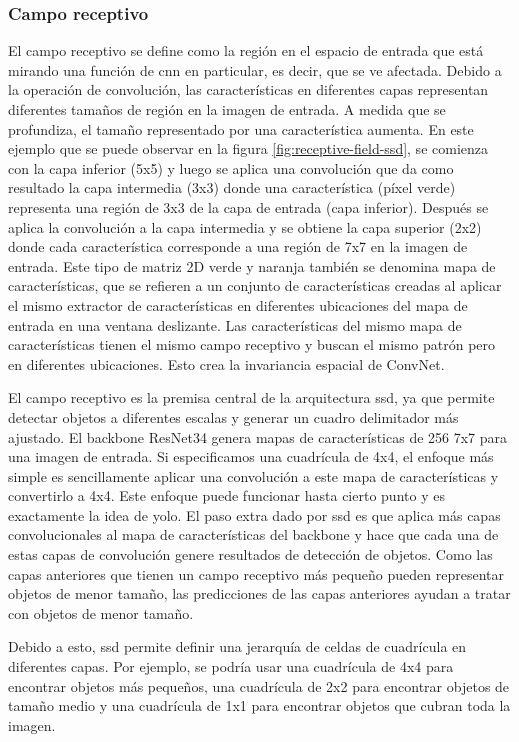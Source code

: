 \subsubsection*{Campo receptivo}
\label{subsubsec:receptive-field-ssd}

El campo receptivo se define como la región en el espacio de entrada que está mirando una función de \gls{cnn} en particular, es decir, que se ve afectada. Debido a la operación de convolución, las características en diferentes capas representan diferentes tamaños de región en la imagen de entrada. A medida que se profundiza, el tamaño representado por una característica aumenta. En este ejemplo que se puede observar en la figura \ref{fig:receptive-field-ssd}, se comienza con la capa inferior (5x5) y luego se aplica una convolución que da como resultado la capa intermedia (3x3) donde una característica (píxel verde) representa una región de 3x3 de la capa de entrada (capa inferior). Después se aplica la convolución a la capa intermedia y se obtiene la capa superior (2x2) donde cada característica corresponde a una región de 7x7 en la imagen de entrada. Este tipo de matriz 2D verde y naranja también se denomina mapa de características, que se refieren a un conjunto de características creadas al aplicar el mismo extractor de características en diferentes ubicaciones del mapa de entrada en una ventana deslizante. Las características del mismo mapa de características tienen el mismo campo receptivo y buscan el mismo patrón pero en diferentes ubicaciones. Esto crea la invariancia espacial de ConvNet.

El campo receptivo es la premisa central de la arquitectura \gls{ssd}, ya que permite detectar objetos a diferentes escalas y generar un cuadro delimitador más ajustado. El backbone ResNet34 genera mapas de características de 256 7x7 para una imagen de entrada. Si especificamos una cuadrícula de 4x4, el enfoque más simple es sencillamente aplicar una convolución a este mapa de características y convertirlo a 4x4. Este enfoque puede funcionar hasta cierto punto y es exactamente la idea de \gls{yolo}. El paso extra dado por \gls{ssd} es que aplica más capas convolucionales al mapa de características del backbone y hace que cada una de estas capas de convolución genere resultados de detección de objetos. Como las capas anteriores que tienen un campo receptivo más pequeño pueden representar objetos de menor tamaño, las predicciones de las capas anteriores ayudan a tratar con objetos de menor tamaño.

Debido a esto, \gls{ssd} permite definir una jerarquía de celdas de cuadrícula en diferentes capas. Por ejemplo, se podría usar una cuadrícula de 4x4 para encontrar objetos más pequeños, una cuadrícula de 2x2 para encontrar objetos de tamaño medio y una cuadrícula de 1x1 para encontrar objetos que cubran toda la imagen.

